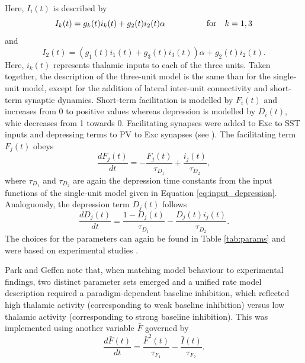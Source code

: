 Here, $I_i(t)$ is described by
\begin{equation}
 I_k(t) = g_k(t)i_k(t)+g_2(t)i_2(t)\alpha \hspace{5em} \textnormal{for} \hspace{1em} k=1,3
\end{equation}
and
\begin{equation}
 I_2(t) = (g_1(t)i_1(t) + g_3(t)i_3(t))\alpha + g_2(t)i_2(t).
\end{equation}
Here, $i_k(t)$ represents thalamic inputs to each of the three units. Taken together, the description of the three-unit model is the same than 
for the single-unit model, except for the addition of lateral inter-unit connectivity and short-term synaptic dynamics. Short-term facilitation 
is modelled by $F_i(t)$ and increases from 0 to positive values whereas depression is modelled by $D_i(t)$, whic decreases from 1 towards 0. 
Facilitating synapses were added to Exc to SST inputs and depressing terms to PV to Exc synapses (see \supercite{beierlein2003two}). The facilitating
term $F_j(t)$ obeys
\begin{equation}
 \frac{dF_j(t)}{dt} = -\frac{F_j(t)}{\tau_{D_1}} + \frac{i_j(t)}{\tau_{D_2}},
\end{equation}
where $\tau_{D_1}$ and $\tau_{D_2}$ are again the depression time constants from the input functions of the single-unit model given in 
Equation \ref{eq:input_depression}. Analoguously, the depression term $D_j(t)$ follows
\begin{equation}
 \frac{dD_j(t)}{dt} = \frac{1-D_j(t)}{\tau_{D_1}} - \frac{D_j(t)i_j(t)}{\tau_{D_2}}.
\end{equation}
The choices for the parameters can again be found in Table \ref{tab:params} and were based on experimental studies \supercite{tsodyks1997paradoxical,
abbott1997synaptic,wehr2005synaptic}. 

Park and Geffen note that, when matching model behaviour to experimental findings, two distinct parameter sets emerged and a unified rate model 
description required a paradigm-dependent baseline inhibition, which reflected high thalamic activity (corresponding to weak baseline inhibition)
versus low thalamic activity (corresponding to strong baseline inhibition). This was implemented using another variable $\bar{F}$ governed by
\begin{equation}
  \frac{d\bar{F}(t)}{dt} = \frac{\bar{F}^2(t)}{\tau_{F_1}} - \frac{\bar{I}(t)}{\tau_{F_2}}.
\end{equation}




